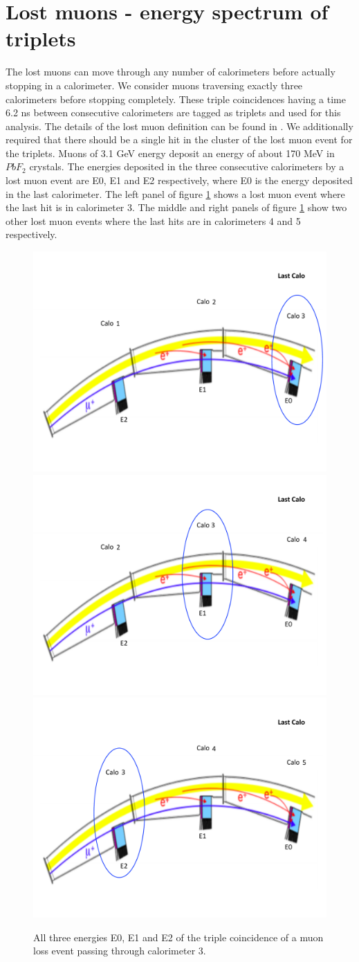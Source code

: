 \documentclass[article,accept,moreauthors,pdftex,10pt,a4paper]{../MDPI_template/Definitions/mdpi}
\begin{document}
\section{Lost muons - energy spectrum of triplets}
\noindent The lost muons can move through any number of calorimeters before actually stopping 
in a calorimeter. We consider muons traversing exactly three calorimeters before stopping completely. 
These triple coincidences having a time 6.2 ns \cite{docdb16402} between consecutive calorimeters are tagged as triplets 
and used for this analysis. The details of the lost muon definition can be found in \cite{docdb16402}. 
We additionally required that there should be a single hit in the cluster of the lost muon event for the triplets.  
Muons of 3.1 GeV energy deposit an energy of about 170 MeV in $PbF_2$ crystals. The energies deposited 
in the three consecutive calorimeters by a lost muon event are E0, E1 and E2 respectively, where E0 is 
the energy deposited in the last calorimeter. The left panel of figure \ref{fig1} 
shows a lost muon event where the last hit is in calorimeter 3. 
The middle and right panels of figure \ref{fig1} show two other lost muon events 
where the last hits are in calorimeters 4 and 5 respectively. 
\begin{figure}[H]
\centering
\includegraphics[width=5 cm]{E0.pdf}
\includegraphics[width=5 cm]{E1.pdf}
\includegraphics[width=5 cm]{E2.pdf}
\caption{\label{fig1} All three energies E0, E1 and E2 of the triple coincidence of a muon loss 
event passing through calorimeter 3. }
\end{figure}  
\end{document}

